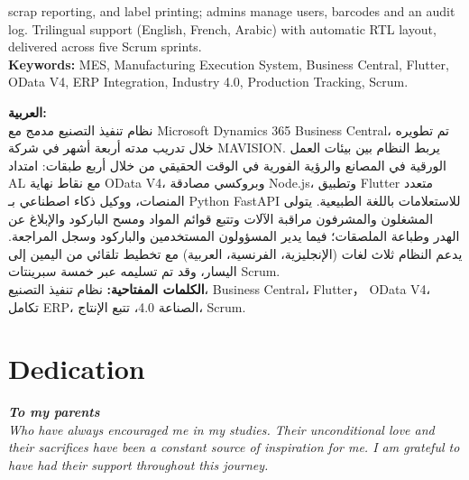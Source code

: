 \documentclass[12pt,a4paper]{report}
\begin{document}
scrap reporting, and label printing; admins manage users, barcodes and an audit log. Trilingual 
support (English, French, Arabic) with automatic RTL layout, delivered across five Scrum sprints. \\[2pt]
\textbf{Keywords:} MES, Manufacturing Execution System, Business Central, Flutter, OData V4,
ERP Integration, Industry 4.0, Production Tracking, Scrum. \\[0pt]
\begin{Arabic}
  \begin{RTL}
    \textbf{العربية:} \\[2pt]
    نظام تنفيذ التصنيع مدمج مع Microsoft Dynamics 365 Business Central، تم تطويره خلال تدريب مدته أربعة أشهر في شركة MAVISION. يربط النظام بين بيئات العمل الورقية في المصانع والرؤية الفورية في الوقت الحقيقي من خلال أربع طبقات: امتداد AL مع نقاط نهاية OData V4، وبروكسي مصادقة Node.js، وتطبيق Flutter متعدد المنصات، ووكيل ذكاء اصطناعي بـ Python FastAPI للاستعلامات باللغة الطبيعية. يتولى المشغلون والمشرفون مراقبة الآلات وتتبع قوائم المواد ومسح الباركود والإبلاغ عن الهدر وطباعة الملصقات؛ فيما يدير المسؤولون المستخدمين والباركود وسجل المراجعة. يدعم النظام ثلاث لغات (الإنجليزية، الفرنسية، العربية) مع تخطيط تلقائي من اليمين إلى اليسار، وقد تم تسليمه عبر خمسة سبرينتات Scrum. \\[2pt]
    \textbf{الكلمات المفتاحية:} نظام تنفيذ التصنيع، Business Central، Flutter，
    OData V4، تكامل ERP، الصناعة 4.0، تتبع الإنتاج، Scrum.
  \end{RTL}
\end{Arabic}
\newpage
\newpage
\newpage

\begingroup
\titlespacing*{\chapter}{0pt}{-50pt}{12pt}
\chapter*{Dedication}
\endgroup

\vspace{12pt}
\itshape
\textbf{To my parents}\\[0.1em]
Who have always encouraged me in my studies. Their unconditional love and
their sacrifices have been a constant source of inspiration for me. I am
grateful to have had their support throughout this journey.\\
\end{document}
